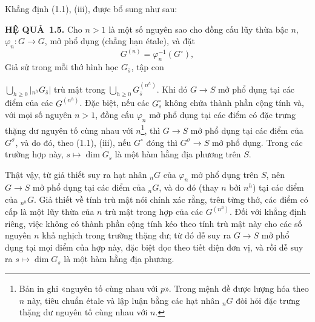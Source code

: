\documentclass[11pt,twoside,openany]{book}
\numberwithin{equation}{section}
\newcommand{\src}[1]{%
  \phantomsection\hypertarget{src:\fgasourceid:#1}{}%
  \marginpar{\raggedleft\footnotesize\sffamily #1}%
}
\newcommand{\fgasourceid}{unset}
\newcommand{\result}[2]{\par\medskip\noindent\textbf{#1\if\relax\detokenize{#2}\relax\else\ #2\fi.}\quad}
\begin{document}
Khẳng định (1.1), (iii), được bổ sung như sau:

\result{HỆ QUẢ}{1.5} Cho $n>1$ là một số nguyên sao cho đồng cấu lũy thừa bậc
$n$, $\varphi_n:G\longrightarrow G$, mở phổ dụng (chẳng hạn étale), và đặt
\[
G^{(n)}=\varphi_n^{-1}(G^\circ),
\]
Giả sử trong mỗi thớ hình học $G_{\bar s}$, tập con
\src{228}
$\bigcup_{h\geq0}|{}_{n^h}G_{\bar s}|$ trù mật trong
$\bigcup_{h\geq0}G_{\bar s}^{(n^h)}$. Khi đó
$G\longrightarrow S$ mở phổ dụng tại các điểm của các $G^{(n^h)}$. Đặc biệt,
nếu các $G_s^\circ$ không chứa thành phần cộng tính và, với mọi số nguyên
$n>1$, đồng cấu $\varphi_n$ mở phổ dụng tại các điểm có đặc trưng thặng dư
nguyên tố cùng nhau với $n$\footnote{Bản in ghi «nguyên tố cùng nhau với
$p$». Trong mệnh đề được lượng hóa theo $n$ này, tiêu chuẩn étale và lập luận
bằng các hạt nhân ${}_nG$ đòi hỏi đặc trưng thặng dư nguyên tố cùng nhau với
$n$.}, thì $G\longrightarrow S$ mở phổ dụng tại các điểm của $G^\sigma$, và
do đó, theo (1.1), (iii), nếu $G^\circ$ đóng thì
$G^\sigma\longrightarrow S$ mở phổ dụng. Trong các trường hợp này,
$s\longmapsto\dim G_s$ là một hàm hằng địa phương trên $S$.

Thật vậy, từ giả thiết suy ra hạt nhân ${}_nG$ của $\varphi_n$ mở phổ dụng
trên $S$, nên $G\longrightarrow S$ mở phổ dụng tại các điểm của ${}_nG$, và
do đó (thay $n$ bởi $n^h$) tại các điểm của ${}_{n^h}G$. Giả thiết về tính trù mật nói chính xác rằng, trên từng thớ, các điểm có cấp
là một lũy thừa của $n$ trù mật trong hợp của các $G^{(n^h)}$. Đối với khẳng
định riêng, việc không có thành phần cộng tính kéo theo tính trù mật này cho
các số nguyên $n$ khả nghịch trong trường thặng dư; từ đó dễ suy
ra $G\longrightarrow S$ mở phổ dụng tại mọi điểm của hợp này, đặc biệt dọc
theo tiết diện đơn vị, và rồi dễ suy ra $s\longmapsto\dim G_s$ là một hàm
hằng địa phương.
\end{document}
